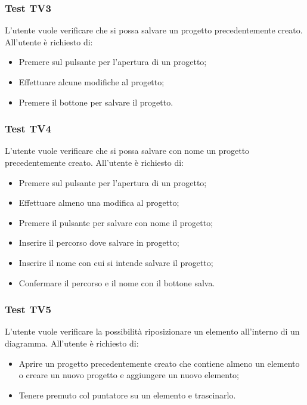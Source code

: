 \documentclass[../PianoDiQualifica.tex]{subfiles}
\begin{document}
	\subsubsection{Test TV3} 
	L'utente vuole verificare che si possa salvare un progetto precedentemente creato. 
	All'utente è richiesto di: 
	\begin{itemize} 
		\item Premere sul pulsante per l'apertura di un progetto; 
		\item Effettuare alcune modifiche al progetto; 
		\item Premere il bottone per salvare il progetto. 
	\end{itemize}     
	\subsubsection{Test TV4} 
	L'utente vuole verificare che si possa salvare con nome un progetto precedentemente creato. 
	All'utente è richiesto di: 
	\begin{itemize} 
		\item Premere sul pulsante per l'apertura di un progetto; 
		\item Effettuare almeno una modifica al progetto; 
		\item Premere il pulsante per salvare con nome il progetto; 
		\item Inserire il percorso dove salvare in progetto; 
		\item Inserire il nome con cui si intende salvare il progetto; 
		\item Confermare il percorso e il nome con il bottone salva. %
	\end{itemize}     
	
	
	
	
	\subsubsection{Test TV5} 
	L'utente vuole verificare la possibilità riposizionare un elemento all'interno di un diagramma. 
	All'utente è richiesto di: 
	\begin{itemize} 
		\item Aprire un progetto precedentemente creato che contiene almeno un elemento o creare un nuovo progetto e aggiungere un nuovo elemento; 
		\item Tenere premuto col puntatore su un elemento e trascinarlo. 
	\end{itemize} 
	
\end{document}

